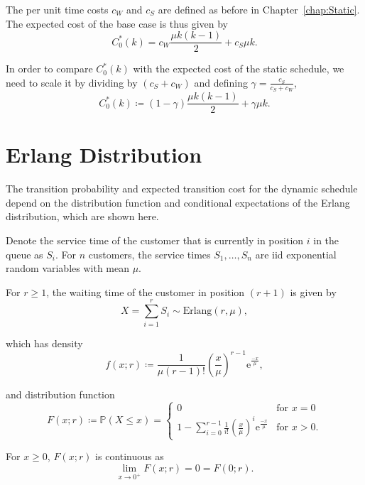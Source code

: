 The per unit time costs $c_{W}$ and $c_{S}$ are defined as before in Chapter~\ref{chap:Static}. The expected cost of the base case is thus given by
\begin{equation}
 	C_{0}^{*} (k) = c_{W} \frac{\mu k (k - 1)}{2} + c_{S} \mu k.
\end{equation}

In order to compare $C_{0}^{*} (k)$ with the expected cost of the static schedule, we need to scale it by dividing by $(c_{S} + c_{W})$ and defining $\gamma = \frac{c_{S}}{c_{S} + c_{W}}$,
\begin{equation}
	C_{0}^{*} (k) \coloneqq (1 - \gamma) \frac{\mu k (k - 1)}{2} + \gamma \mu k.
\end{equation}

\section{Erlang Distribution}
The transition probability and expected transition cost for the dynamic schedule depend on the distribution function and conditional expectations of the Erlang distribution, which are shown here.

Denote the service time of the customer that is currently in position $i$ in the queue as $S_{i}$. For $n$ customers, the service times $S_{1}, \ldots, S_{n}$ are iid exponential random variables with mean $\mu$.

For $r \geq 1$, the waiting time of the customer in position $(r + 1)$ is given by
\begin{equation}
	X = \sum_{i = 1}^{r} S_{i} \sim \text{Erlang}(r, \mu),
\end{equation}

which has density
\begin{equation}
	f (x; r) \coloneqq \frac{1}{\mu (r - 1)!} \left( \frac{x}{\mu} \right)^{r - 1} \mathrm{e}^{\frac{-x}{\mu}},
\end{equation}

and distribution function
\begin{equation}
	F (x; r) \coloneqq \mathbb{P} (X \leq x) = \begin{cases} 0 & \text{for $x = 0$} \\ 1 - \sum_{i = 0}^{r - 1} \frac{1}{i!} \left( \frac{x}{\mu} \right)^{i} \mathrm{e}^{\frac{-x}{\mu}} & \text{for $x > 0$}. \end{cases}
\end{equation}

For $x \geq 0$, $F (x; r)$ is continuous as
\begin{equation}
	\lim_{x \to 0^{+}} F (x; r) = 0 = F (0; r).
\end{equation}

